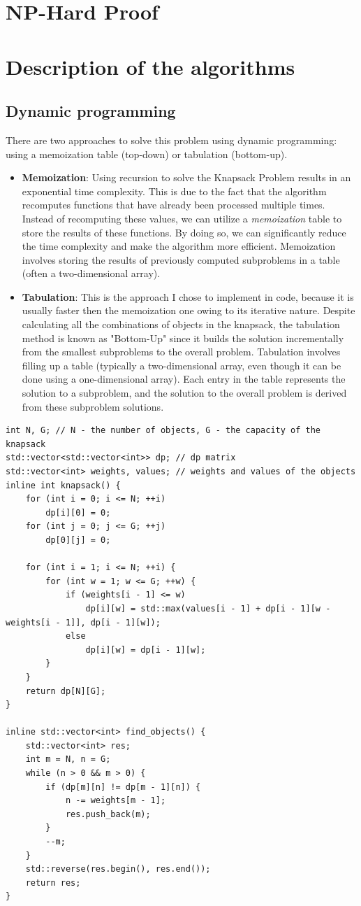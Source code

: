 \documentclass{llncs}
\begin{document}
\section{NP-Hard Proof}

\section{Description of the algorithms}
\subsection{Dynamic programming}
There are two approaches to solve this problem using dynamic programming:
using a memoization table (top-down) or tabulation (bottom-up). 
\begin{itemize}
    \item \textbf{Memoization}: Using recursion to solve the Knapsack Problem results in an exponential
	time complexity. This is due to the fact that the algorithm recomputes functions that have already
	been processed multiple times. Instead of recomputing these values, we can utilize a \textit{memoization}
	table to store the results of these functions. By doing so, we can significantly reduce the time complexity and make the algorithm more efficient. Memoization involves storing the results of previously computed subproblems in a table (often a two-dimensional array).
    \item \textbf{Tabulation}: This is the approach I chose to implement in code, because it is usually
	faster then the memoization one owing to its iterative nature. Despite calculating all the
	combinations of objects in the knapsack, the tabulation method is known as "Bottom-Up" since
	it builds the solution incrementally from the smallest subproblems to the overall problem.
	Tabulation involves filling up a table (typically a two-dimensional array, even though it can be
	done using a one-dimensional array). Each entry in the table represents the solution to a subproblem,
	and the solution to the overall problem is derived from these subproblem solutions.
\end{itemize}

\begin{lstlisting}
int N, G; // N - the number of objects, G - the capacity of the knapsack
std::vector<std::vector<int>> dp; // dp matrix
std::vector<int> weights, values; // weights and values of the objects
inline int knapsack() {
	for (int i = 0; i <= N; ++i)
		dp[i][0] = 0;
	for (int j = 0; j <= G; ++j)
		dp[0][j] = 0;

	for (int i = 1; i <= N; ++i) {
		for (int w = 1; w <= G; ++w) {
			if (weights[i - 1] <= w)
				dp[i][w] = std::max(values[i - 1] + dp[i - 1][w - weights[i - 1]], dp[i - 1][w]);
			else
				dp[i][w] = dp[i - 1][w];
		}
	}
	return dp[N][G];
}

inline std::vector<int> find_objects() {
	std::vector<int> res;
	int m = N, n = G;
	while (n > 0 && m > 0) {
		if (dp[m][n] != dp[m - 1][n]) {
			n -= weights[m - 1];
			res.push_back(m);
		}
		--m;
	}
	std::reverse(res.begin(), res.end());
	return res;
}
\end{lstlisting}
\end{document}
